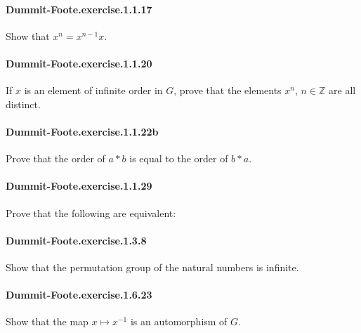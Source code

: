 \documentclass{article}
\begin{document}
\paragraph{Dummit-Foote.exercise.1.1.17} Show that $x^n = x^{n-1} x$.

\paragraph{Dummit-Foote.exercise.1.1.20} If $x$ is an element of infinite order in $G$, prove that the elements $x^n$, $n\in\mathbb{Z}$ are all distinct.

\paragraph{Dummit-Foote.exercise.1.1.22b} Prove that the order of $a * b$ is equal to the order of $b * a$.

\paragraph{Dummit-Foote.exercise.1.1.29} Prove that the following are equivalent:

\paragraph{Dummit-Foote.exercise.1.3.8} Show that the permutation group of the natural numbers is infinite.


\paragraph{Dummit-Foote.exercise.1.6.23} Show that the map $x \mapsto x^{-1}$ is an automorphism of $G$.


\end{document}
